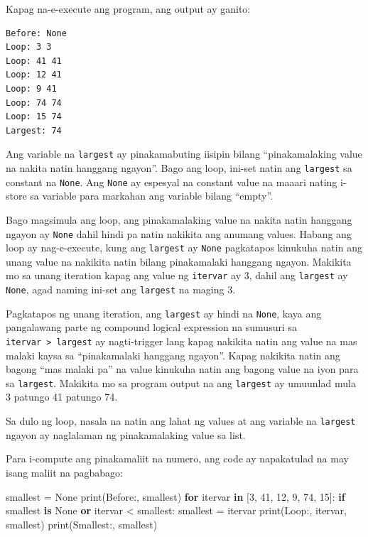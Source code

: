 \documentclass[10pt,]{book}
\newenvironment{Shaded}{}{}
\newcommand{\BuiltInTok}[1]{\textcolor[rgb]{0.00,0.50,0.00}{#1}}
\newcommand{\ControlFlowTok}[1]{\textcolor[rgb]{0.00,0.44,0.13}{\textbf{#1}}}
\newcommand{\DecValTok}[1]{\textcolor[rgb]{0.25,0.63,0.44}{#1}}
\newcommand{\KeywordTok}[1]{\textcolor[rgb]{0.00,0.44,0.13}{\textbf{#1}}}
\newcommand{\NormalTok}[1]{#1}
\newcommand{\OperatorTok}[1]{\textcolor[rgb]{0.40,0.40,0.40}{#1}}
\newcommand{\StringTok}[1]{\textcolor[rgb]{0.25,0.44,0.63}{#1}}
\newcommand{\VariableTok}[1]{\textcolor[rgb]{0.10,0.09,0.49}{#1}}
\begin{document}
Kapag na-e-execute ang program, ang output ay ganito:

{\small
\begin{verbatim}
Before: None
Loop: 3 3
Loop: 41 41
Loop: 12 41
Loop: 9 41
Loop: 74 74
Loop: 15 74
Largest: 74
\end{verbatim}
}

Ang variable na \texttt{largest} ay pinakamabuting iisipin bilang
``pinakamalaking value na nakita natin hanggang ngayon''. Bago ang loop,
ini-set natin ang \texttt{largest} sa constant na \texttt{None}. Ang
\texttt{None} ay espesyal na constant value na maaari nating i-store sa
variable para markahan ang variable bilang ``empty''.

Bago magsimula ang loop, ang pinakamalaking value na nakita natin
hanggang ngayon ay \texttt{None} dahil hindi pa natin nakikita ang
anumang values. Habang ang loop ay nag-e-execute, kung ang
\texttt{largest} ay \texttt{None} pagkatapos kinukuha natin ang unang
value na nakikita natin bilang pinakamalaki hanggang ngayon. Makikita mo
sa unang iteration kapag ang value ng \texttt{itervar} ay 3, dahil ang
\texttt{largest} ay \texttt{None}, agad naming ini-set ang
\texttt{largest} na maging 3.

Pagkatapos ng unang iteration, ang \texttt{largest} ay hindi na
\texttt{None}, kaya ang pangalawang parte ng compound logical expression
na sumusuri sa \texttt{itervar\ \textgreater{}\ largest} ay
nagti-trigger lang kapag nakikita natin ang value na mas malaki kaysa sa
``pinakamalaki hanggang ngayon''. Kapag nakikita natin ang bagong ``mas
malaki pa'' na value kinukuha natin ang bagong value na iyon para sa
\texttt{largest}. Makikita mo sa program output na ang \texttt{largest}
ay umuunlad mula 3 patungo 41 patungo 74.

Sa dulo ng loop, nasala na natin ang lahat ng values at ang variable na
\texttt{largest} ngayon ay naglalaman ng pinakamalaking value sa list.

Para i-compute ang pinakamaliit na numero, ang code ay napakatulad na
may isang maliit na pagbabago:

\begin{Shaded}
\begin{Highlighting}[]
\NormalTok{smallest }\OperatorTok{=} \VariableTok{None}
\BuiltInTok{print}\NormalTok{(}\StringTok{\textquotesingle{}Before:\textquotesingle{}}\NormalTok{, smallest)}
\ControlFlowTok{for}\NormalTok{ itervar }\KeywordTok{in}\NormalTok{ [}\DecValTok{3}\NormalTok{, }\DecValTok{41}\NormalTok{, }\DecValTok{12}\NormalTok{, }\DecValTok{9}\NormalTok{, }\DecValTok{74}\NormalTok{, }\DecValTok{15}\NormalTok{]:}
    \ControlFlowTok{if}\NormalTok{ smallest }\KeywordTok{is} \VariableTok{None} \KeywordTok{or}\NormalTok{ itervar }\OperatorTok{\textless{}}\NormalTok{ smallest:}
\NormalTok{        smallest }\OperatorTok{=}\NormalTok{ itervar}
    \BuiltInTok{print}\NormalTok{(}\StringTok{\textquotesingle{}Loop:\textquotesingle{}}\NormalTok{, itervar, smallest)}
\BuiltInTok{print}\NormalTok{(}\StringTok{\textquotesingle{}Smallest:\textquotesingle{}}\NormalTok{, smallest)}
\end{Highlighting}
\end{Shaded}
\end{document}
